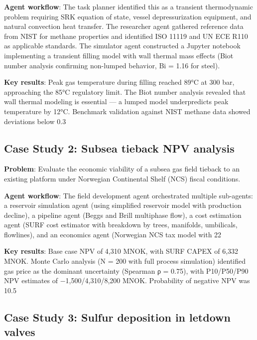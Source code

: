 \documentclass[review,3p]{elsarticle}
\begin{document}
\textbf{Agent workflow}: The task planner identified this as a transient thermodynamic problem requiring SRK equation of state, vessel depressurization equipment, and natural convection heat transfer. The researcher agent gathered reference data from NIST for methane properties and identified ISO 11119 and UN ECE R110 as applicable standards. The simulator agent constructed a Jupyter notebook implementing a transient filling model with wall thermal mass effects (Biot number analysis confirming non-lumped behavior, Bi = 1.16 for steel).

\textbf{Key results}: Peak gas temperature during filling reached 89°C at 300 bar, approaching the 85°C regulatory limit. The Biot number analysis revealed that wall thermal modeling is essential --- a lumped model underpredicts peak temperature by 12°C. Benchmark validation against NIST methane data showed deviations below 0.3%

\subsection{Case Study 2: Subsea tieback NPV analysis}

\textbf{Problem}: Evaluate the economic viability of a subsea gas field tieback to an existing platform under Norwegian Continental Shelf (NCS) fiscal conditions.

\textbf{Agent workflow}: The field development agent orchestrated multiple sub-agents: a reservoir simulation agent (using simplified reservoir model with production decline), a pipeline agent (Beggs and Brill multiphase flow), a cost estimation agent (SURF cost estimator with breakdown by trees, manifolds, umbilicals, flowlines), and an economics agent (Norwegian NCS tax model with 22%

\textbf{Key results}: Base case NPV of 4,310 MNOK, with SURF CAPEX of 6,332 MNOK. Monte Carlo analysis (N = 200 with full process simulation) identified gas price as the dominant uncertainty (Spearman ρ = 0.75), with P10/P50/P90 NPV estimates of −1,500/4,310/8,200 MNOK. Probability of negative NPV was 10.5%

\subsection{Case Study 3: Sulfur deposition in letdown valves}
\end{document}
